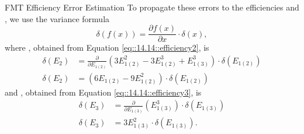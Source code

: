 \begin{frame}{FMT Efficiency Error Estimation}
    To propagate these errors to the efficiencies  and , we use the variance formula
    \begin{equation*}
        \delta\left(f(x)\right) = \frac{\partial f(x)}{\partial x} \cdot \delta(x),
    \end{equation*}
    where , obtained from Equation \eqref{eq::14.14::efficiency2}, is
    \begin{align*}
        \delta(E_2) &= \frac{\partial}{\partial E_{1(2)}} \left( 3E_{1(2)}^2 - 3E_{1(2)}^3 + E_{1(3)}^3 \right)
            \cdot \delta \left( E_{1(2)} \right) \\
        \delta(E_2) &= \left( 6E_{1(2)} - 9E_{1(2)}^2 \right) \cdot \delta \left( E_{1(2)} \right)
    \end{align*}
    and , obtained from Equation \eqref{eq::14.14::efficiency3}, is
    \begin{align*}
        \delta(E_3) &= \frac{\partial}{\partial E_{1(3)}} \left( E_{1(3)}^3 \right) \cdot \delta \left( E_{1(3)} \right) \\
        \delta(E_3) &= 3E_{1(3)}^2 \cdot \delta \left( E_{1(3)} \right).
    \end{align*}

\end{frame}

